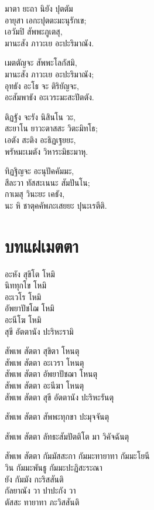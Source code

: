 มาตา ยะถา นิยัง ปุตตัม\\
อายุสา เอกะปุตตะมะนุรักเข;\\
เอวัมปิ สัพพะภูเตสุ,\\
มานะสัง ภาวะเย อะปะริมาณัง.

เมตตัญจะ สัพพะโลกัสมิ,\\
มานะสัง ภาวะเย อะปะริมาณัง;\\
อุทธัง อะโธ จะ ติริยัญจะ,\\
อะสัมพาธัง อะเวระมะสะปัตตัง.

ติฏฐัง จะรัง นิสินโน วะ,\\
สะยาโน ยาวะตาสสะ วิตะมิทโธ;\\
เอตัง สะติง อะธิฏเฐยยะ,\\
พรัหมะเมตัง วิหาระมิธะมาหุ.

ทิฏฐิญจะ อะนุปัคคัมมะ,\\
สีละวา ทัสสะเนนะ สัมปันโน;\\
กาเมสุ วินะยะ เคธัง,\\
นะ หิ ชาตุคคัพภะเสยยะ ปุนะเรตีติ.

\chapter[แผ่เมตตา]{บทแผ่เมตตา}


อะหัง สุขิโต โหมิ\\
นิททุกโข โหมิ\\
อะเวโร โหมิ\\
อัพยาปัชโฌ โหมิ\\
อะนีโฆ โหมิ\\
สุขี อัตตานัง ปะริหะรามิ

สัพเพ สัตตา สุขิตา โหนตุ\\
สัพเพ สัตตา อะเวรา โหนตุ\\
สัพเพ สัตตา อัพยาปัชฌา โหนตุ\\
สัพเพ สัตตา อะนีฆา โหนตุ\\
สัพเพ สัตตา สุขี อัตตานัง ปะริหะรันตุ

สัพเพ สัตตา สัพพะทุกขา ปะมุจจันตุ

สัพเพ สัตตา ลัทธะสัมปัตติโต มา วิคัจฉันตุ

สัพเพ สัตตา กัมมัสสะกา กัมมะทายาทา กัมมะโยนี\\
วิน กัมมะพันธู กัมมะปะฏิสะระณา\\
ยัง กัมมัง กะริสสันติ\\
กัลยาณัง วา ปาปะกัง วา\\
ตัสสะ ทายาทา ภะวิสสันติ

